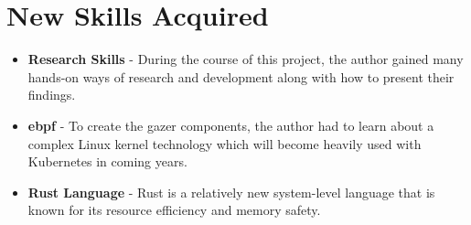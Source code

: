 \section{New Skills Acquired}

\begin{itemize}[noitemsep,nolistsep]
    \item \textbf{Research Skills} - During the course of this project, the author gained many hands-on ways of research and development along with how to present their findings.
    \item \textbf{\ac{ebpf}} - To create the \ac{gazer} components, the author had to learn about a complex Linux kernel technology which will become heavily used with Kubernetes in coming years.
    \item \textbf{Rust Language} - Rust is a relatively new system-level language that is known for its resource efficiency and memory safety.
\end{itemize}